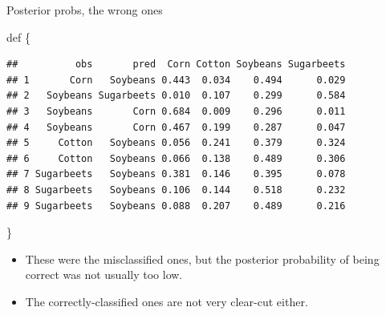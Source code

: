 \documentclass[ignorenonframetext,]{beamer}
\newenvironment{Shaded}{\begin{snugshade}}{\end{snugshade}}
\newcommand{\DataTypeTok}[1]{\textcolor[rgb]{0.13,0.29,0.53}{#1}}
\newcommand{\DecValTok}[1]{\textcolor[rgb]{0.00,0.00,0.81}{#1}}
\newcommand{\KeywordTok}[1]{\textcolor[rgb]{0.13,0.29,0.53}{\textbf{#1}}}
\newcommand{\NormalTok}[1]{#1}
\newcommand{\OperatorTok}[1]{\textcolor[rgb]{0.81,0.36,0.00}{\textbf{#1}}}
\newcommand{\StringTok}[1]{\textcolor[rgb]{0.31,0.60,0.02}{#1}}
\begin{document}
\begin{frame}[fragile]{Posterior probs, the wrong ones}
\protect\hypertarget{posterior-probs-the-wrong-ones}{}

def \{\footnotesize  

\begin{Shaded}
\end{Shaded}

\begin{verbatim}
##          obs       pred  Corn Cotton Soybeans Sugarbeets
## 1       Corn   Soybeans 0.443  0.034    0.494      0.029
## 2   Soybeans Sugarbeets 0.010  0.107    0.299      0.584
## 3   Soybeans       Corn 0.684  0.009    0.296      0.011
## 4   Soybeans       Corn 0.467  0.199    0.287      0.047
## 5     Cotton   Soybeans 0.056  0.241    0.379      0.324
## 6     Cotton   Soybeans 0.066  0.138    0.489      0.306
## 7 Sugarbeets   Soybeans 0.381  0.146    0.395      0.078
## 8 Sugarbeets   Soybeans 0.106  0.144    0.518      0.232
## 9 Sugarbeets   Soybeans 0.088  0.207    0.489      0.216
\end{verbatim}

\}

\begin{itemize}
\item
  These were the misclassified ones, but the posterior probability of
  being correct was not usually too low.
\item
  The correctly-classified ones are not very clear-cut either.
\end{itemize}

\end{frame}
\end{document}
